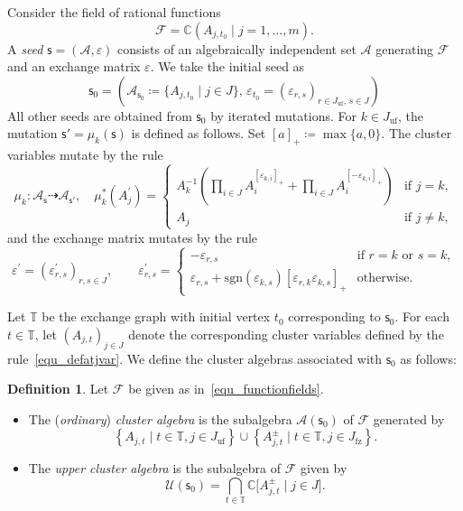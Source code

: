 \documentclass[11pt]{amsart}
\newcommand{\C}{\mathbb{C}}
\def\mcal{\mathcal}
\numberwithin{equation}{section}
\theoremstyle{plain}
\theoremstyle{definition}
\newtheorem{definition}[theorem]{Definition}
\numberwithin{equation}{section}
\newcommand{\uf}{\mathrm{uf}}
\newcommand{\seed}{\mathsf{s}}
\begin{document}
Consider the field of rational functions
\begin{equation}\label{equ_functionfields}
\mathcal{F} = \C \left( A_{j,t_0} \mid j = 1, \dots, m \right). 
\end{equation}
A \emph{seed} $\seed = (\mathcal{A}, \varepsilon)$ consists of an algebraically independent set $\mathcal{A}$ generating $\mathcal{F}$ and an exchange matrix $\varepsilon$. We take the initial seed as
\begin{equation}\label{equ_initialseed}
\seed_0 = \left( \mathcal{A}_{\seed_0} \coloneqq \{ A_{j,t_0} \mid j \in J \}, \, \varepsilon_{t_0}  = (\varepsilon_{r,s})_{r \in J_{\uf},\, s \in J} \right)
\end{equation}
All other seeds are obtained from $\seed_0$ by iterated mutations. For $k \in J_{\mathrm{uf}}$, the mutation $\seed' = \mu_k(\seed)$ is defined as follows. Set $[a]_+ \coloneqq \max \{a,0\}$. The cluster variables mutate by the rule
\begin{equation}\label{equ_defatjvar}
\mu_k \colon \mcal{A}_\seed \dashrightarrow \mcal{A}_{\seed'}, \quad
\mu_k^*(A^\prime_j) =
\begin{cases}
A_k^{-1} \left( \prod_{i \in J} A_i^{[\varepsilon_{k,i}]_+} + \prod_{i \in J} A_i^{[-\varepsilon_{k,i}]_+} \right) & \text{if } j = k, \\
A_j & \text{if } j \neq k,
\end{cases}
\end{equation}
and the exchange matrix mutates by the rule 
\begin{equation}\label{equ_mutationexchangematri}
\varepsilon^\prime = (\varepsilon_{r,s}^\prime)_{r,s \in J}, \qquad
\varepsilon_{r,s}^\prime =
\begin{cases}
- \varepsilon_{r,s} & \text{if } r = k \text{ or } s = k, \\
\varepsilon_{r,s} + \mathrm{sgn}(\varepsilon_{k,s}) [\varepsilon_{r,k}\varepsilon_{k,s}]_+ & \text{otherwise.}
\end{cases}
\end{equation}

Let $\mathbb{T}$ be the exchange graph with initial vertex $t_0$ corresponding to $\seed_0$. For each $t \in \mathbb{T}$, let $(A_{j,t})_{j \in J}$ denote the corresponding cluster variables defined by the rule~\eqref{equ_defatjvar}. We define the cluster algebras associated with $\seed_0$ as follows$\colon$

\begin{definition}\label{definition_clusteralg}
Let $\mathcal{F}$ be given as in~\eqref{equ_functionfields}.
\begin{itemize}
\item The (\emph{ordinary}) \emph{cluster algebra} is the subalgebra $\mathcal{A}(\seed_0)$ of $\mathcal{F}$ generated by
$$
\left\{A_{j,t} \mid t \in \mathbb{T}, j \in J_{\mathrm{uf}} \right\} \cup \left\{ A_{j,t}^\pm \mid t \in \mathbb{T}, j \in J_\mathrm{fz} \right\}.
$$
\item The \emph{upper cluster algebra} is the subalgebra of $\mathcal{F}$ given by
$$
\mathcal{U}(\seed_0) = \bigcap_{t \in \mathbb{T}} \C \bigl[ A_{j,t}^{\pm} \mid j \in J \bigr].
$$
\end{itemize}
\end{definition}
\end{document}
